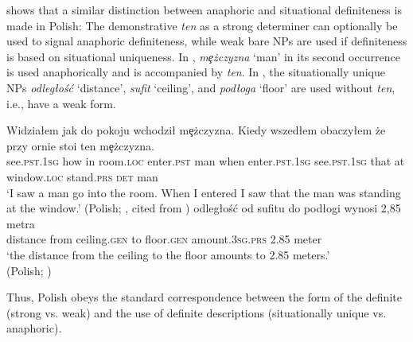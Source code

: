 \documentclass[output=paper,
colorlinks,
citecolor=brown,
newtxmath
]{langscibook}
\begin{document}
\noindent \citet{Czardybon2017} shows that a similar distinction between anaphoric and situational definiteness is made in Polish: The demonstrative \textit{ten} as a strong determiner can optionally be used to signal anaphoric definiteness, while weak bare NPs are used if definiteness is based on situational uniqueness. In , \textit{mȩżczyzna} `man' in its second occurrence is used anaphorically and is accompanied by \textit{ten}. In , the situationally unique NPs \textit{odległość} `distance', \textit{sufit} `ceiling’, and \textit{podłoga} `floor' are used without \textit{ten}, i.e., have a weak form.

    \largerpage[-2] %

\ea \label{ex:8}
\ea
\gll Widziałem jak do pokoju wchodził mȩżczyzna. Kiedy wszedłem obaczyłem że przy ornie stoi ten mȩżczyzna. \\
    see.\textsc{pst}.1\textsc{sg} how in room.\textsc{loc} enter.\textsc{pst} man when enter.\textsc{pst}.1\textsc{sg} see.\textsc{pst}.1\textsc{sg} that at window.\textsc{loc} stand.\textsc{prs} \textsc{det} man\\
\glt `I saw a man go into the room. When I entered I saw that the man was standing at the window.' \glt \hfill (Polish; \citealt[96--97]{Szwedek1976}, cited from \citealt[50]{Czardybon2017})\label{ex:8a}
\ex \gll [\dots] odległość od sufitu do podłogi wynosi 2,85 metra \\
 {} distance from ceiling.\textsc{gen} to floor.\textsc{gen} amount.3\textsc{sg.prs} 2.85 meter\\
\glt `the distance from the ceiling to the floor amounts to 2.85 meters.' \\
\glt \hfill (Polish; \citealt[74]{Czardybon2017}) \label{ex:8b}
\z
\z

\noindent Thus, Polish obeys the standard correspondence between the form of the definite (strong vs. weak) and the use of definite descriptions (situationally unique vs. anaphoric).
\end{document}
